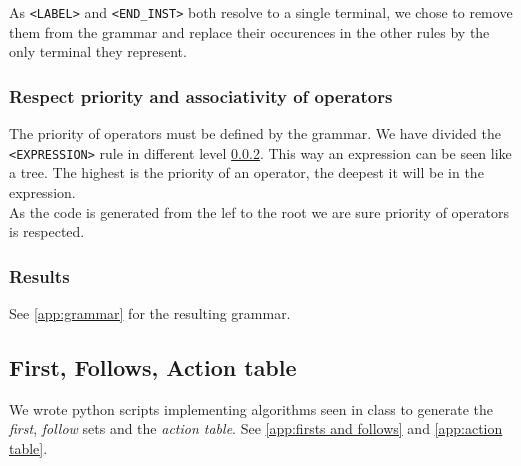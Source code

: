 As \verb!<LABEL>! and \verb!<END_INST>! both resolve to a single terminal, we chose to remove them from the grammar and replace their occurences in the other rules by the only terminal they represent.

\subsubsection{Respect priority and associativity of operators}

The priority of operators must be defined by the grammar. We have divided the \verb!<EXPRESSION>! rule in different level \ref{expression}. This way an expression can be seen like a tree. The highest is the priority of an operator, the deepest it will be in the expression.\\ As the code is generated from the lef to the root we are sure priority of operators is respected.  



\subsubsection{Results}
\label{expression}
See \ref{app:grammar} for the resulting grammar.

\subsection{First, Follows, Action table}

We wrote python scripts implementing algorithms seen in class to generate the \emph{first}, \emph{follow} sets and the \emph{action table}. See \ref{app:firsts and follows} and \ref{app:action table}.

